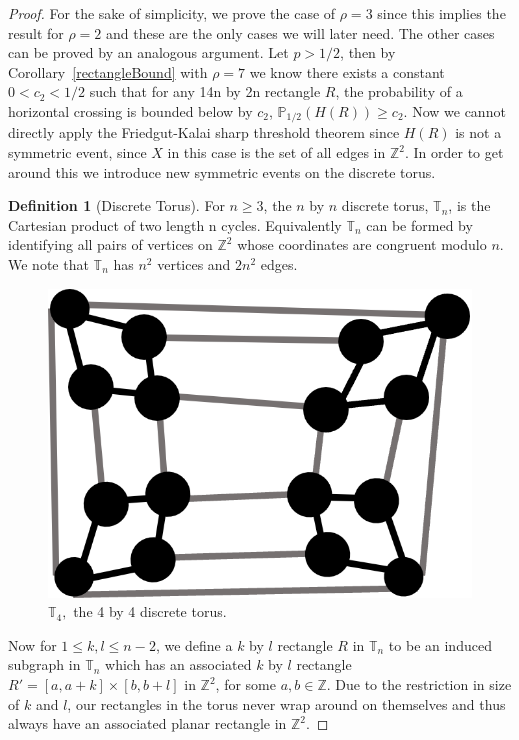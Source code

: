 \documentclass[a4paper,11pt]{article}
\theoremstyle{definition}
\newtheorem{definition}[theorem]{Definition}
\newcommand{\ints}{\mathbb{Z}}
\begin{document}
\begin{proof}
	For the sake of simplicity, we prove the case of $\rho = 3$ since this implies the result for $\rho =2$ and these are the only cases we will later need. The other cases can be proved by an analogous argument. Let $p>1/2$, then by Corollary~\ref*{rectangleBound} with $\rho = 7$ we know there exists a constant $0<c_2<1/2$ such that for any 14n by 2n rectangle $R$, the probability of a horizontal crossing is bounded below by $c_2$, $\mathbb{P}_{1/2}(H(R)) \geq c_2$. Now we cannot directly apply the Friedgut-Kalai sharp threshold theorem since $H(R)$ is not a symmetric event, since $X$ in this case is the set of all edges in $\ints^2$. In order to get around this we introduce new symmetric events on the discrete torus. 
	\begin{definition}[Discrete Torus]
	For $n \geq 3$, the $n$ by $n$ discrete torus, $\mathbb{T}_n$, is the Cartesian product of two length n cycles. Equivalently $\mathbb{T}_n$ can be formed by identifying all pairs of vertices on $\ints^2$ whose coordinates are congruent modulo $n$. We note that $\mathbb{T}_n$ has $n^2$ vertices and $2n^2$ edges.
	\end{definition}

	\begin{figure}
		\centering
		\includegraphics[scale=0.8]{drawings/torus.png}
		\caption{$\mathbb{T}_4,$ the 4 by 4 discrete torus.}
		\label{fig:torus}
	\end{figure}

	Now for $1 \leq k,l \leq n-2$, we define a $k$ by $l$ rectangle $R$ in $\mathbb{T}_n$ to be an induced subgraph in $\mathbb{T}_n$ which has an associated $k$ by $l$ rectangle $R' = [a,a+k] \times [b,b+l]$ in $\ints^2$, for some $a,b \in \ints$. Due to the restriction in size of $k$ and $l$, our rectangles in the torus never wrap around on themselves and thus always have an associated planar rectangle in $\ints^2$.
	

\end{proof}
\end{document}
